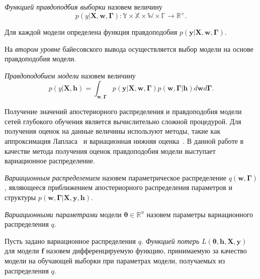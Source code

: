 \begin{defin}
\textit{Функцией правдоподбия выборки } назовем величину
\[
    p(y|\mathbf{X}, \mathbf{w}, \boldsymbol{\Gamma}): \mathbb{Y} \times \mathbb{X} \times \mathbb{W} \times \mathbb{\Gamma} \to \mathbb{R}^{+}.
\]
\end{defin}
Для каждой модели определена функция правдоподобия  $p(\mathbf{y}|\mathbf{X}, \mathbf{w}, \boldsymbol{\Gamma})$.
 
На \textit{втором уровне} байесовского вывода осуществляется выбор модели на основе правдоподобия модели.
\begin{defin}
\textit{Правдоподобием модели }назовем величину
\begin{equation}
\label{eq:evidence}
p(y|\mathbf{X}, \mathbf{h}) = \int_{\mathbf{w}, \boldsymbol{\Gamma}} p(\mathbf{y}|\mathbf{X}, \mathbf{w}, \boldsymbol{\Gamma})p(\mathbf{w}, \boldsymbol{\Gamma}|\mathbf{h})d\mathbf{w}d\boldsymbol{\Gamma}.
\end{equation}
\end{defin}
Получение значений апостериорного распределения и правдоподобия модели сетей глубокого обучения является вычислительно сложной процедурой. Для получения оценок на данные величины используют методы, такие как аппроксимация Лапласа~\cite{tokmakova} и вариационная нижняя оценка~\cite{nips}.  В данной работе в качестве метода получения оценок правдоподобия модели выступает вариационное распределение.

\begin{defin}
\textit{Вариационным распределением} назовем параметрическое распределение $q(\mathbf{w}, \boldsymbol{\Gamma})$, являющееся приближением  апостериорного распределения параметров и структуры $p(\mathbf{w}, \boldsymbol{\Gamma}|\mathbf{X}, \mathbf{y}, \mathbf{h}).$ 
\end{defin}

\begin{defin}
\textit{Вариационными параметрами} модели $\boldsymbol{\theta} \in \mathbb{R}^u$ назовем параметры вариационного распределения $q$.
\end{defin} 

\begin{defin}
Пусть задано вариационное распределения $q$.
\textit{Функцией потерь} $L( \boldsymbol{\theta}, \mathbf{h}, \mathbf{X}, \mathbf{y})$ для модели $\mathbf{f}$ назовем дифференцируемую функцию, принимаемую за качество модели на обучающей выборки при параметрах модели, получаемых из  распределения $q$.
\end{defin}

